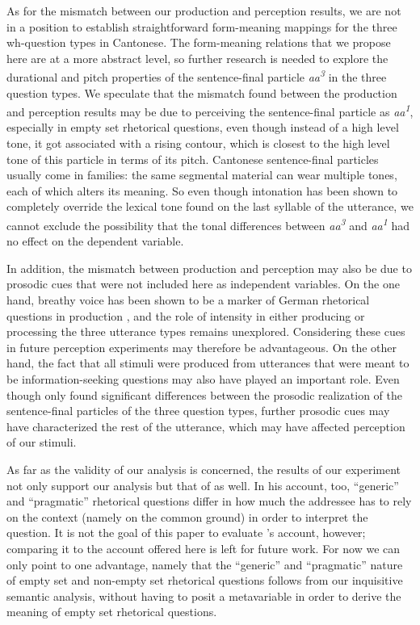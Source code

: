 \documentclass[output=paper,colorlinks,citecolor=brown            ,chinesefont]{langscibook}
\begin{document}
As for the mismatch between our production and perception results, we are not in a position to establish straightforward form-meaning mappings for the three wh-question types in Cantonese. The form-meaning relations that we propose here are at a more abstract level, so further research is needed to explore the durational and pitch properties of the sentence-final particle \textit{aa\textsuperscript{3}} in the three question types. We speculate that the mismatch found between the production and perception results may be due to perceiving the sentence-final particle as \textit{aa\textsuperscript{1}}, especially in empty set rhetorical questions, even though instead of a high level tone, it got associated with a rising contour,  which is closest to the high level tone of this particle in terms of its pitch. Cantonese sentence-final particles usually come in families: the same segmental material can wear multiple tones, each of which alters its meaning. So even though intonation has been shown to completely override the lexical tone found on the last syllable of the utterance, we cannot exclude the possibility that the tonal differences between \textit{aa\textsuperscript{3}} and \textit{aa\textsuperscript{1}} had no effect on the dependent variable.

In addition, the mismatch between production and perception may also be due to prosodic cues that were not included here as independent variables. On the one hand, breathy voice has been shown to be a marker of German rhetorical questions in production \citep{Braun+2018}, and the role of intensity in either producing or processing the three utterance types remains unexplored. Considering these cues in future perception experiments may therefore be advantageous. On the other hand, the fact that all stimuli were produced from utterances that were meant to be information-seeking questions may also have played an important role. Even though \citet{Lo+2019} only found significant differences between the prosodic realization of the sentence-final particles of the three question types, further prosodic cues may have characterized the rest of the utterance, which may have affected perception of our stimuli.


As far as the validity of our analysis is concerned, the results of our experiment not only support our analysis but that of \citet{Jamieson2018phd} as well. In his account, too, ``generic'' and ``pragmatic'' rhetorical questions differ in how much the addressee has to rely on the context (namely on the common ground) in order to interpret the question. It is not the goal of this paper to evaluate \citeauthor{Jamieson2018phd}'s account, however; comparing it to the account offered here is left for future work. For now we can only point to one advantage, namely that the ``generic'' and ``pragmatic'' nature of empty set and non-empty set rhetorical questions follows from our inquisitive semantic analysis, without having to posit a metavariable in order to derive the meaning of empty set rhetorical questions.
\end{document}
